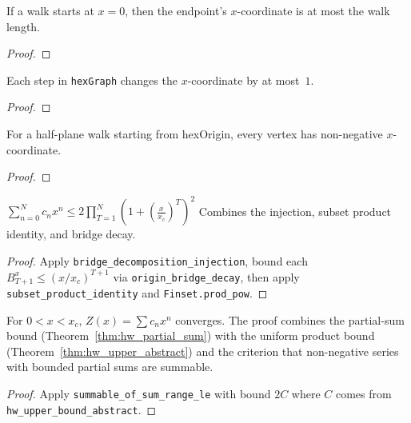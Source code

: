 \begin{lemma}\label{lem:walk_endpoint_x}
\leanok
{}
  If a walk starts at $x = 0$, then the endpoint's $x$-coordinate
  is at most the walk length.
\end{lemma}
\begin{proof}
\leanok
\end{proof}

\begin{lemma}\label{lem:adj_x_diff}
\leanok
{}
  Each step in \texttt{hexGraph} changes the $x$-coordinate by at most~$1$.
\end{lemma}
\begin{proof}
\leanok
\end{proof}

\begin{lemma}\label{lem:halfplane_nonneg}
\leanok
{}
  For a half-plane walk starting from hexOrigin, every vertex
  has non-negative $x$-coordinate.
\end{lemma}
\begin{proof}
\leanok
\end{proof}

\begin{theorem}\label{thm:hw_partial_sum}
\leanok
{}
  $\sum_{n=0}^{N} c_n x^n \leq 2 \prod_{T=1}^{N} \left(1 + \left(\frac{x}{x_c}\right)^T\right)^2$
  Combines the injection, subset product identity, and bridge decay.
\end{theorem}
\begin{proof}
\leanok
{}
  Apply \texttt{bridge\_decomposition\_injection}, bound each
  $B_{T+1}^x \leq (x/x_c)^{T+1}$ via \texttt{origin\_bridge\_decay},
  then apply \texttt{subset\_product\_identity} and
  \texttt{Finset.prod\_pow}.
\end{proof}

\begin{theorem}\label{thm:hw_summable}
\leanok
{}
  For $0 < x < x_c$, $Z(x) = \sum c_n x^n$ converges.
  The proof combines the partial-sum bound (Theorem~\ref{thm:hw_partial_sum})
  with the uniform product bound (Theorem~\ref{thm:hw_upper_abstract})
  and the criterion that non-negative series with bounded partial sums
  are summable.
\end{theorem}
\begin{proof}
\leanok
{}
  Apply \texttt{summable\_of\_sum\_range\_le} with bound $2C$
  where $C$ comes from \texttt{hw\_upper\_bound\_abstract}.
\end{proof}

